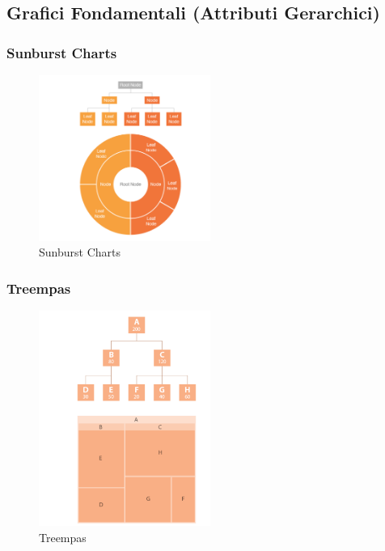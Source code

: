 \subsection{Grafici Fondamentali (Attributi Gerarchici)}
\subsubsection{Sunburst Charts}
\begin{figure}[H]
    \centering
    \includegraphics[width=0.5\textwidth]{images/SunBurst.png} %
    \caption{Sunburst Charts}
    \label{fig:immagine}
\end{figure}
\subsubsection{Treempas}
\begin{figure}[H]
    \centering
    \includegraphics[width=0.5\textwidth]{images/TreeMpas.png} %
    \caption{Treempas}
    \label{fig:immagine}
\end{figure}